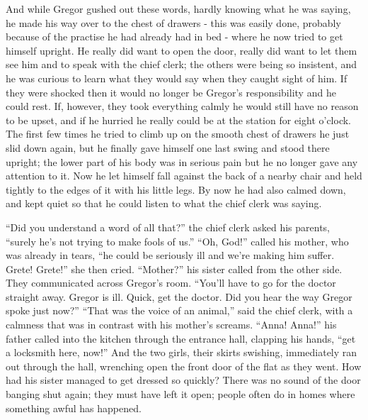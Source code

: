 \documentclass[12pt]{report}
\begin{document}
And while Gregor gushed out these words, hardly knowing what he was
saying, he made his way over to the chest of drawers - this was easily
done, probably because of the practise he had already had in bed - where
he now tried to get himself upright. He really did want to open the
door, really did want to let them see him and to speak with the chief
clerk; the others were being so insistent, and he was curious to learn
what they would say when they caught sight of him. If they were shocked
then it would no longer be Gregor's responsibility and he could rest.
If, however, they took everything calmly he would still have no reason
to be upset, and if he hurried he really could be at the station for
eight o'clock. The first few times he tried to climb up on the smooth
chest of drawers he just slid down again, but he finally gave himself
one last swing and stood there upright; the lower part of his body was
in serious pain but he no longer gave any attention to it. Now he let
himself fall against the back of a nearby chair and held tightly to the
edges of it with his little legs. By now he had also calmed down, and
kept quiet so that he could listen to what the chief clerk was saying.

``Did you understand a word of all that?'' the chief clerk asked his
parents, ``surely he's not trying to make fools of us.'' ``Oh, God!''
called his mother, who was already in tears, ``he could be seriously ill
and we're making him suffer. Grete! Grete!'' she then cried. ``Mother?''
his sister called from the other side. They communicated across Gregor's
room. ``You'll have to go for the doctor straight away. Gregor is ill.
Quick, get the doctor. Did you hear the way Gregor spoke just now?''
``That was the voice of an animal,'' said the chief clerk, with a
calmness that was in contrast with his mother's screams. ``Anna! Anna!''
his father called into the kitchen through the entrance hall, clapping
his hands, ``get a locksmith here, now!'' And the two girls, their
skirts swishing, immediately ran out through the hall, wrenching open
the front door of the flat as they went. How had his sister managed to
get dressed so quickly? There was no sound of the door banging shut
again; they must have left it open; people often do in homes where
something awful has happened.
\end{document}
